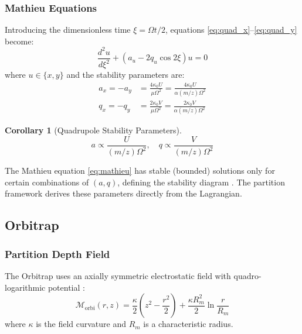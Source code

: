 \documentclass[twocolumn,10pt,a4paper]{article}
\newtheorem{corollary}[theorem]{Corollary}
\theoremstyle{definition}
\theoremstyle{remark}
\newcommand{\Mdepth}{\mathcal{M}}
\newcommand{\partinert}{\mu}
\begin{document}
\subsubsection{Mathieu Equations}

Introducing the dimensionless time $\xi = \Omega t/2$, equations \eqref{eq:quad_x}--\eqref{eq:quad_y} become:
\begin{equation}
    \frac{d^2 u}{d\xi^2} + (a_u - 2q_u\cos 2\xi)u = 0
    \label{eq:mathieu}
\end{equation}
where $u \in \{x, y\}$ and the stability parameters are:
\begin{align}
    a_x = -a_y &= \frac{4\kappa_0 U}{\partinert\Omega^2} = \frac{4\kappa_0 U}{\alpha(m/z)\Omega^2} \label{eq:a_param} \\
    q_x = -q_y &= \frac{2\kappa_0 V}{\partinert\Omega^2} = \frac{2\kappa_0 V}{\alpha(m/z)\Omega^2} \label{eq:q_param}
\end{align}

\begin{corollary}[Quadrupole Stability Parameters]
\begin{equation}
    \boxed{a \propto \frac{U}{(m/z)\Omega^2}, \quad q \propto \frac{V}{(m/z)\Omega^2}}
\end{equation}
\end{corollary}

The Mathieu equation \eqref{eq:mathieu} has stable (bounded) solutions only for certain combinations of $(a, q)$, defining the stability diagram \citep{paul1990}. The partition framework derives these parameters directly from the Lagrangian.

\subsection{Orbitrap}

\subsubsection{Partition Depth Field}

The Orbitrap uses an axially symmetric electrostatic field with quadro-logarithmic potential \citep{makarov2000}:
\begin{equation}
    \Mdepth_{\mathrm{orbi}}(r, z) = \frac{\kappa}{2}\left(z^2 - \frac{r^2}{2}\right) + \frac{\kappa R_m^2}{2}\ln\frac{r}{R_m}
    \label{eq:orbitrap_field}
\end{equation}
where $\kappa$ is the field curvature and $R_m$ is a characteristic radius.
\end{document}
